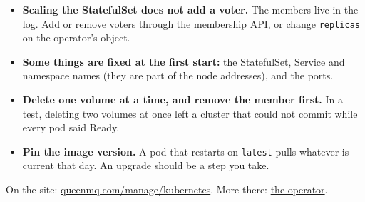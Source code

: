\begin{itemize}
\item \textbf{Scaling the StatefulSet does not add a voter.} The members live in the log. Add or
remove voters through the membership API, or change \texttt{replicas} on the operator's object.
\item \textbf{Some things are fixed at the first start:} the StatefulSet, Service and namespace
names (they are part of the node addresses), and the ports.
\item \textbf{Delete one volume at a time, and remove the member first.} In a test, deleting two
volumes at once left a cluster that could not commit while every pod said Ready.
\item \textbf{Pin the image version.} A pod that restarts on \texttt{latest} pulls whatever is
current that day. An upgrade should be a step you take.
\end{itemize}

On the site: \href{https://queenmq.com/manage/kubernetes/}{queenmq.com/manage/kubernetes}. More there: \href{https://queenmq.com/manage/operator/}{the operator}.
